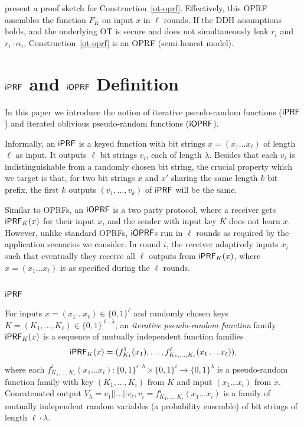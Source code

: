 \citet{oprf} present a proof sketch for
Construction~\ref{ot-oprf}. Effectively, this OPRF assembles the
\citeauthor{prf} function $F_K$ on input $x$ in $\ell$ rounds.  If
the DDH assumptions holds, and the underlying OT is secure and does
not simultaneously leak $r_i$ and $r_i\cdot\alpha_i$, 
Construction~\ref{ot-oprf} is an OPRF (semi-honest
model).

\section{$\iprf$ and $\mathsf{i}\mathsf{OPRF}$ Definition}
In this paper we introduce the notion of iterative pseudo-random
functions ($\iprf$) and iterated oblivious pseudo-random functions
($\mathsf{i}\mathsf{OPRF}$).

Informally, an $\iprf$ is a keyed function with bit strings
$x=(x_1\ldots{}x_\ell)$ of length $\ell$ as input. It outputs $\ell$
bit strings $v_i$, each of length $\lambda$. Besides that each $v_i$
is indistinguishable from a randomly chosen bit string, the crucial
property which we target is that, for two bit strings $x$ and $x'$
sharing the same length $k$ bit prefix, the first $k$ outputs
$(v_1,\ldots,v_k)$ of $\iprf$ will be the same.

Similar to OPRFs, an $\mathsf{i}\mathsf{OPRF}$ is a two party protocol, where a
receiver gets $\mathsf{i}\mathsf{PRF}_K(x)$ for their input $x$, and the sender with
input key $K$ does not learn $x$. However, unlike standard OPRFs,
$\mathsf{i}\mathsf{OPRF}$s run in $\ell$ rounds as required by the application
scenarios we consider. In round $i$, the receiver adaptively inputs
$x_i$ such that eventually they receive all $\ell$ outputs from
$\mathsf{i}\mathsf{PRF}_K(x)$, where $x=(x_1\ldots{}x_\ell)$ is as specified during the
$\ell$ rounds.

\subsection{$\iprf$}
\begin{definition}[$\iprf$]\label{defiprf}
  For inputs $x=(x_1\ldots{}x_\ell)\in\{0,1\}^\ell$ and randomly
  chosen keys $K=(K_1,\ldots,K_\ell)\in\{0,1\}^{\ell\cdot\lambda}$, an
  \emph{iterative pseudo-random function} family $\mathsf{i}\mathsf{PRF}_K(x)$ is a sequence
  of mutually independent function families
  $$\mathsf{i}\mathsf{PRF}_K(x)=(f^1_{K_1}(x_{1}),\ldots,f^\ell_{K_1,\ldots,K_\ell}(x_{1}\ldots{}x_{\ell})),$$
  where each
  $f^i_{K_1,\ldots,K_i}(x_{1}\ldots{}x_{i}):\{0,1\}^{i\cdot\lambda}\times\{0,1\}^{i}\rightarrow{}\{0,1\}^\lambda$
  is a pseudo-random function family with key $(K_1,\ldots,K_i)$ from
  $K$ and input $(x_1\ldots{}x_i)$ from $x$.
 Concatenated output
  $V_\lambda=v_1||\ldots||v_\ell,v_i=f^i_{K_1,\ldots,K_i}(x_1\ldots{}x_i)$
  is a family of mutually independent random variables (a probability ensemble) of bit
  strings of length $\ell\cdot\lambda$.
\end{definition}

